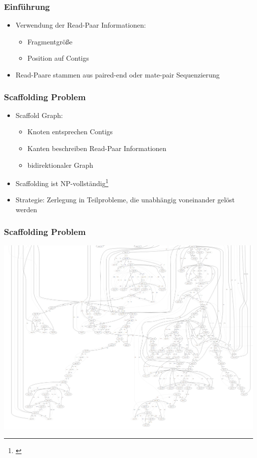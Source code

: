 \documentclass[xcolor=pst]{beamer}
\begin{document}
\begin{frame}
  \frametitle{Einführung}
  \begin{itemize}
  \item Verwendung der Read-Paar Informationen:
    \begin{itemize}
    \item Fragmentgröße
    \item Position auf Contigs
    \end{itemize}
  \item Read-Paare stammen aus paired-end oder mate-pair Sequenzierung
  \end{itemize}
\end{frame}

\begin{frame}
  \frametitle{Scaffolding Problem}
  \begin{itemize}
  \item Scaffold Graph:
    \begin{itemize}
    \item Knoten entsprechen Contigs
    \item Kanten beschreiben Read-Paar
      Informationen
    \item bidirektionaler Graph
    \end{itemize}
  \item Scaffolding ist NP-vollständig\footnote{\cite{Huson:2002kf}}
  \item Strategie: Zerlegung in %
    Teilprobleme, die unabhängig voneinander gelöst werden
  \end{itemize}
\end{frame}

\begin{frame}
  \frametitle{Scaffolding Problem}
  \begin{center}
    \includegraphics[width=\textwidth,height=\textheight,keepaspectratio]{figures/Scaffolding_graph.png}
  \end{center}
\end{frame}
\end{document}
